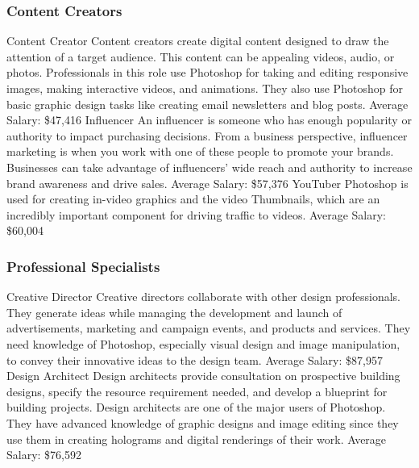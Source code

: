 \documentclass{beamer}
\begin{document}
	\begin{frame}
	\frametitle{Content Creators}
	\begin{outline}
		\1 Content Creator 
		\2 Content creators create digital content designed to draw the attention of a target audience. This content can be appealing videos, audio, or photos. Professionals in this role use Photoshop for taking and editing responsive images, making interactive videos, and animations. They also use Photoshop for basic graphic design tasks like creating email newsletters and blog posts.
		\2 Average Salary:  \$47,416
		\1 Influencer
		\2 An influencer is someone who has enough popularity or authority to impact purchasing decisions. From a business perspective, influencer marketing is when you work with one of these people to promote your brands. Businesses can take advantage of influencers' wide reach and authority to increase brand awareness and drive sales.
		\2 Average Salary:  \$57,376
		\1 YouTuber
		\2 Photoshop is used for creating in-video graphics and the video Thumbnails, which are an incredibly important component for driving traffic to videos.
		\2 Average Salary:  \$60,004
	\end{outline}
\end{frame}

	\begin{frame}
	\frametitle{Professional Specialists}
	\begin{outline}
		\1 Creative Director 
		\2 Creative directors collaborate with other design professionals. They generate ideas while managing the development and launch of advertisements, marketing and campaign events, and products and services. They need knowledge of Photoshop, especially visual design and image manipulation, to convey their innovative ideas to the design team. 
		\2 Average Salary:  \$87,957
		\1 Design Architect
		\2 Design architects provide consultation on prospective building designs, specify the resource requirement needed, and develop a blueprint for building projects. Design architects are one of the major users of Photoshop. They have advanced knowledge of graphic designs and image editing since they use them in creating holograms and digital renderings of their work. 
		\2 Average Salary:  \$76,592
	\end{outline}
\end{frame}
\end{document}
